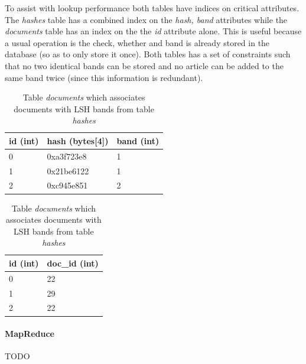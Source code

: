 To assist with lookup performance both tables have indices on critical attributes. The \emph{hashes} table has a combined index on the \emph{hash, band} attributes while the \emph{documents} table has an index on the the \emph{id} attribute alone. This is useful because a usual operation is the check, whether and band is already stored in the database (so as to only store it once). Both tables has a set of constraints such that no two identical bands can be stored and no article can be added to the same band twice (since this information is redundant).

\begin{table}[ht]
    \begin{minipage}[b]{0.56\linewidth}
        \centering
        \begin{tabular}{|l|l|l|}
            \hline
            id (int) & hash (bytes{[}4{]}) & band (int) \\ \hline
            0        & 0xa3f723e8          & 1          \\ \hline
            1        & 0x21be6122          & 1          \\ \hline
            2        & 0xc945e851          & 2          \\ \hline
        \end{tabular}
        \caption{Table \emph{hashes} which stores information on each LSH band with the hash value and the band id}
        \label{table:sqlite1}
    \end{minipage}\hfill
    \begin{minipage}[b]{0.4\linewidth}
        \centering
        \begin{tabular}{|l|l|}
            \hline
            id (int) & doc\_id (int) \\ \hline
            0        & 22            \\ \hline
            1        & 29            \\ \hline
            2        & 22            \\ \hline
        \end{tabular}
        \caption{Table \emph{documents} which associates documents with LSH bands from table \emph{hashes}}
        \label{table:sqlite2}
    \end{minipage}
\end{table}

\paragraph{MapReduce} TODO


